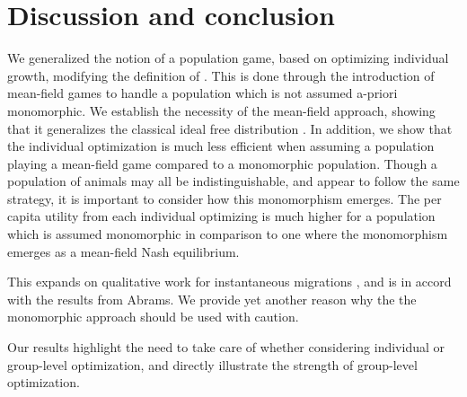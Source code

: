 \section{Discussion and conclusion}

We generalized the notion of a population game, based on optimizing individual growth, modifying the definition of \citep{vincent2005evolutionary}. This is done through the introduction of mean-field games to handle a population which is not assumed a-priori monomorphic. We establish the necessity of the mean-field approach, showing that it generalizes the classical ideal free distribution \citep{fretwell1969territorial}. In addition, we show that the individual optimization is much less efficient when assuming a population playing a mean-field game compared to a monomorphic population. Though a population of animals may all be indistinguishable, and appear to follow the same strategy, it is important to consider how this monomorphism emerges. The per capita utility from each individual optimizing is much higher for a population which is assumed monomorphic in comparison to one where the monomorphism emerges as a mean-field Nash equilibrium.

This expands on qualitative work for instantaneous migrations \citep{kvrivan2008ideal,collet2019algorithmic}, and is in accord with the results from Abrams. We provide yet another reason why the the monomorphic approach should be used with caution.

Our results highlight the need to take care of whether considering individual or group-level optimization, and directly illustrate the strength of group-level optimization. %


